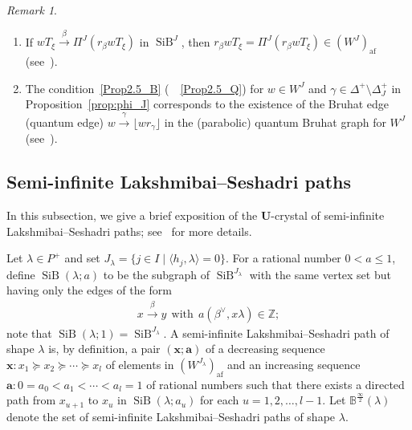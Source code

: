 \documentclass[10pt]{amsart}
\theoremstyle{definition}\newtheorem{defi}[theo]{Definition}
\theoremstyle{remark}\newtheorem{rema}[theo]{Remark}
\newcommand{\BZ}{\mathbb{Z}}
\newcommand\bm[1]{\boldsymbol{#1}}
\newcommand{\U}{\mathbf{U}}
\newcommand{\si}{\frac{\infty}{2}}
\DeclareMathOperator{\af}{af}
\DeclareMathOperator{\SiB}{SiB}
\begin{document}
\begin{rema}\ \\[-1.2em]
\begin{enumerate}[label=(\arabic*)]
\item\label{Rema2.6_1}
If 
$wT_{\xi} \xrightarrow{\ \beta \ } \Pi^J(r_{\beta}wT_{\xi})$
in 
$\SiB ^J$, 
then 
$r_{\beta}wT_{\xi} = \Pi^J (r_{\beta}wT_{\xi}) \in (W^J)_{\af}$
(see~\cite[Appendix~A]{INS16}). 
\item\label{Rema2.6_2}
The condition~\ref{Prop2.5_B} (\resp~~\ref{Prop2.5_Q}) for 
$w \in W^J$ 
and 
$\gamma \in \Delta^+ \setminus \Delta^+_J$ 
in Proposition~\ref{prop:phi_J} corresponds to the existence of the 
Bruhat edge (\resp quantum edge) 
$w \xrightarrow{\ \gamma \ } \lfloor w r_{\gamma} \rfloor$
in the (parabolic) quantum Bruhat graph for 
$W^J$
(see~\cite[\S~4]{LNSSS15}).
\end{enumerate}
\end{rema}

\subsection{Semi-infinite Lakshmibai--Seshadri paths}

In this subsection, 
we give a brief exposition of the 
$\U$-crystal of semi-infinite Lakshmibai--Seshadri paths; 
see~\cite{INS16} for more details.

Let 
$\lambda \in P^+$
and set 
$J_{\lambda} = \{ j \in I \mid \langle h_j , \lambda \rangle = 0 \}$. 
For a rational number 
$0 < a \leq 1$, 
define 
$\SiB (\lambda;a)$
to be the subgraph of 
$\SiB ^{J_{\lambda}}$ 
with the same vertex set 
but having only the edges of the form 
\begin{align}
x \xrightarrow{\ \beta \ } y
\ \ \text{with} \ \ 
a ( \beta^{\vee} , x\lambda ) \in \BZ ;
\end{align}
note that 
$\SiB (\lambda ; 1) = \SiB ^{J_{\lambda}}$. 
A semi-infinite Lakshmibai--Seshadri path of shape $\lambda$ is, by definition, 
a pair 
$(\bm{x}; \bm{a})$
of a decreasing sequence 
$\bm{x} : x_1 \succeq x_2 \succeq \cdots \succeq x_l$ 
of elements in $(W^{J_{\lambda}})_{\af}$
and an increasing sequence
$\bm{a} : 0 = a_0 < a_1 < \cdots < a_l = 1$ 
of rational numbers such that 
there exists a directed path from
$x_{u+1}$ to $x_u$ in $\SiB (\lambda;a_u)$ 
for each $u=1,2,\ldots ,l-1$. 
Let 
$\mathbb{B}^{\si}(\lambda)$ 
denote the set of semi-infinite Lakshmibai--Seshadri paths of shape $\lambda$. 
\end{document}

